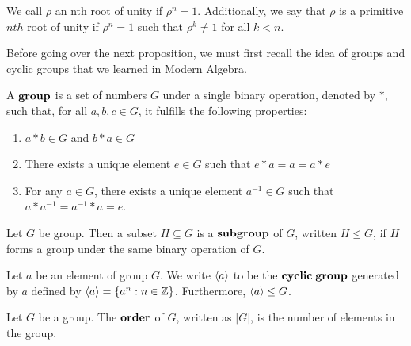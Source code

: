 \documentclass[a4paper]{article}
\begin{document}
\begin{definition}
We call $\rho$ an nth root of unity if $\rho^n=1$.  Additionally, we say that 
$\rho$ is a primitive $nth$ root of unity if $\rho^n=1$ such that 
$\rho^k\neq 1$ for all $k<n$.
\end{definition}

Before going over the next proposition, we must first recall the idea
of groups and cyclic groups that we learned in Modern Algebra.

\begin{definition}[Group]
A $\bf{group}$ is a set of numbers $G$ under a single binary operation, 
denoted by $*$, such that, for all $a,b,c\in G$, it fulfills the 
following properties:
\begin{enumerate}
  \item $a*b\in G$ and $b*a\in G$
  \item There exists a unique element $e\in G$ such that $e*a=a=a*e$
  \item For any $a\in G$, there exists a unique element $a^{-1}\in G$ such that
  $a*a^{-1}=a^{-1}*a=e$.
\end{enumerate}
\end{definition}

\begin{definition}[Subgroup]
Let $G$ be group. Then a subset $H\subseteq G$ is a $\bf{subgroup}$ of 
$G$, written $H\leq G$, if $H$ forms a group under the same binary 
operation of $G$.
\end{definition}

\begin{definition}
Let $a$ be an element of group $G$.  We write $\langle a\rangle$ to be the 
$\bf{cyclic\;group}$ generated by $a$ defined by $\langle a\rangle=\{a^n:n\in\mathbb Z\}$. 
Furthermore, $\langle a\rangle\leq G$.
\end{definition}

\begin{definition}
Let $G$ be a group.  The $\bf{order}$ of $G$, written as $|G|$, is the 
number of elements in the group.
\end{definition}
\end{document}
